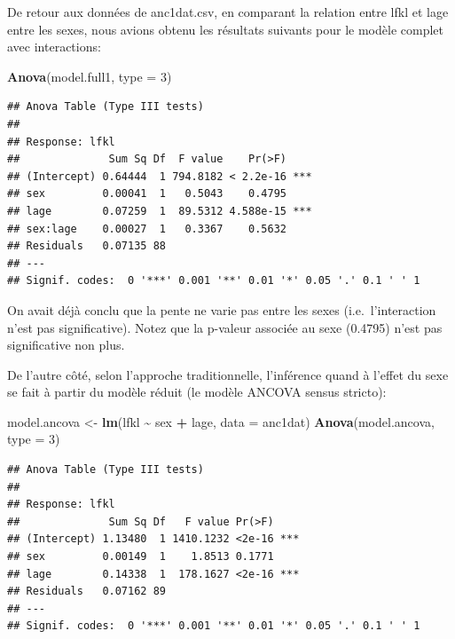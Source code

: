 \documentclass[
  12pt,
]{book}
\newenvironment{Shaded}{\begin{snugshade}}{\end{snugshade}}
\newcommand{\DataTypeTok}[1]{\textcolor[rgb]{0.13,0.29,0.53}{#1}}
\newcommand{\DecValTok}[1]{\textcolor[rgb]{0.00,0.00,0.81}{#1}}
\newcommand{\KeywordTok}[1]{\textcolor[rgb]{0.13,0.29,0.53}{\textbf{#1}}}
\newcommand{\NormalTok}[1]{#1}
\newcommand{\OperatorTok}[1]{\textcolor[rgb]{0.81,0.36,0.00}{\textbf{#1}}}
\newcommand{\StringTok}[1]{\textcolor[rgb]{0.31,0.60,0.02}{#1}}
\begin{document}
De retour aux données de anc1dat.csv, en comparant la relation entre lfkl et lage entre les sexes, nous avions obtenu les résultats suivants pour le modèle complet avec interactions:

\begin{Shaded}
\begin{Highlighting}[]
\KeywordTok{Anova}\NormalTok{(model.full1, }\DataTypeTok{type =} \DecValTok{3}\NormalTok{)}
\end{Highlighting}
\end{Shaded}

\begin{verbatim}
## Anova Table (Type III tests)
## 
## Response: lfkl
##              Sum Sq Df  F value    Pr(>F)    
## (Intercept) 0.64444  1 794.8182 < 2.2e-16 ***
## sex         0.00041  1   0.5043    0.4795    
## lage        0.07259  1  89.5312 4.588e-15 ***
## sex:lage    0.00027  1   0.3367    0.5632    
## Residuals   0.07135 88                       
## ---
## Signif. codes:  0 '***' 0.001 '**' 0.01 '*' 0.05 '.' 0.1 ' ' 1
\end{verbatim}

On avait déjà conclu que la pente ne varie pas entre les sexes (i.e.~l'interaction n'est pas significative). Notez que la p-valeur associée au sexe (0.4795) n'est pas significative non plus.

De l'autre côté, selon l'approche traditionnelle, l'inférence quand à l'effet du sexe se fait à partir du modèle réduit (le modèle ANCOVA sensus stricto):

\begin{Shaded}
\begin{Highlighting}[]
\NormalTok{model.ancova \textless{}{-}}\StringTok{ }\KeywordTok{lm}\NormalTok{(lfkl }\OperatorTok{\textasciitilde{}}\StringTok{ }\NormalTok{sex }\OperatorTok{+}\StringTok{ }\NormalTok{lage, }\DataTypeTok{data =}\NormalTok{ anc1dat)}
\KeywordTok{Anova}\NormalTok{(model.ancova, }\DataTypeTok{type =} \DecValTok{3}\NormalTok{)}
\end{Highlighting}
\end{Shaded}

\begin{verbatim}
## Anova Table (Type III tests)
## 
## Response: lfkl
##              Sum Sq Df   F value Pr(>F)    
## (Intercept) 1.13480  1 1410.1232 <2e-16 ***
## sex         0.00149  1    1.8513 0.1771    
## lage        0.14338  1  178.1627 <2e-16 ***
## Residuals   0.07162 89                     
## ---
## Signif. codes:  0 '***' 0.001 '**' 0.01 '*' 0.05 '.' 0.1 ' ' 1
\end{verbatim}
\end{document}
